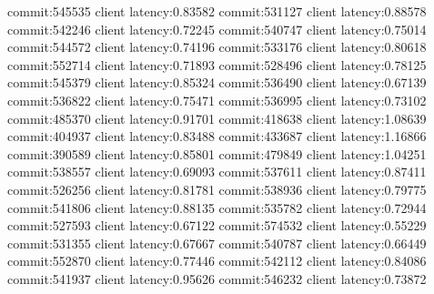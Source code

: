 commit:545535 client latency:0.83582
commit:531127 client latency:0.88578
commit:542246 client latency:0.72245
commit:540747 client latency:0.75014
commit:544572 client latency:0.74196
commit:533176 client latency:0.80618
commit:552714 client latency:0.71893
commit:528496 client latency:0.78125
commit:545379 client latency:0.85324
commit:536490 client latency:0.67139
commit:536822 client latency:0.75471
commit:536995 client latency:0.73102
commit:485370 client latency:0.91701
commit:418638 client latency:1.08639
commit:404937 client latency:0.83488
commit:433687 client latency:1.16866
commit:390589 client latency:0.85801
commit:479849 client latency:1.04251
commit:538557 client latency:0.69093
commit:537611 client latency:0.87411
commit:526256 client latency:0.81781
commit:538936 client latency:0.79775
commit:541806 client latency:0.88135
commit:535782 client latency:0.72944
commit:527593 client latency:0.67122
commit:574532 client latency:0.55229
commit:531355 client latency:0.67667
commit:540787 client latency:0.66449
commit:552870 client latency:0.77446
commit:542112 client latency:0.84086
commit:541937 client latency:0.95626
commit:546232 client latency:0.73872